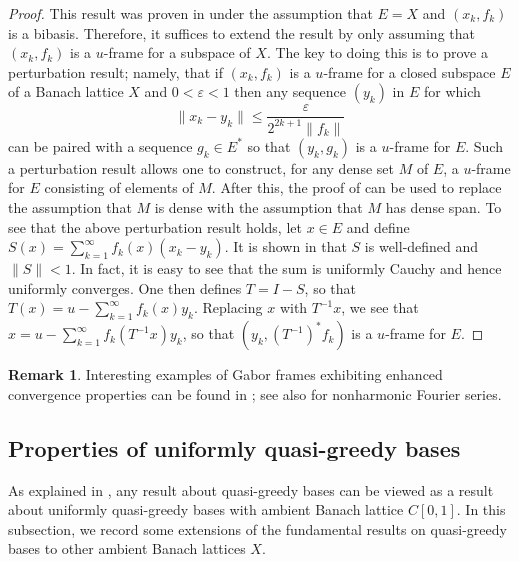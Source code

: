 \documentclass[12pt,leqno]{amsart}
\numberwithin{equation}{section}
\theoremstyle{definition}
\newtheorem{remark}[theorem]{Remark}
\begin{document}
\begin{proof}
    This result was proven in \cite[Theorem 4.4]{FPT2} under the assumption that $E=X$ and $(x_k,f_k)$ is a bibasis. Therefore, it suffices to extend the result by only assuming that $(x_k,f_k)$ is a $u$-frame for a subspace of $X$. The key to doing this is to prove a perturbation result; namely, that if $(x_k,f_k)$ is a $u$-frame for a closed subspace $E$ of a Banach lattice $X$ and $0<\varepsilon<1$ then any sequence $(y_k)$ in $E$ for which
$$\|x_k-y_k\| \leq \frac{\varepsilon}{2^{2k+1}\|f_k\|}$$
can be paired with a sequence $g_k\in E^*$ so that $(y_k,g_k)$ is a $u$-frame for $E$. Such a perturbation result allows one to construct, for any  dense set $M$ of $E$, a $u$-frame for $E$ consisting  of elements of $M$. After this, the proof of \cite[Theorem 4.4]{FPT2} can be used to replace the assumption that $M$ is dense with the assumption that $M$ has dense span. To see that the above perturbation result holds, let $x\in E$ and define $S(x)=\sum_{k=1}^{\infty}f_k(x)(x_k-y_k)$. It is shown in \cite[Lemma 2.3]{PS} that $S$ is well-defined and $\|S\|<1$. In fact, it is easy to see that the sum is uniformly Cauchy and hence uniformly converges. One then defines $T=I-S$, so that $T(x)=u-\sum_{k=1}^\infty f_k(x)y_k$. Replacing $x$ with $T^{-1}x$, we see that $x=u-\sum_{k=1}^\infty f_k(T^{-1}x) y_k$, so that $(y_k, (T^{-1})^*f_k)$ is a $u$-frame for $E$.
\end{proof}
\begin{remark}
  Interesting examples of Gabor frames exhibiting enhanced convergence properties can be found in \cite{MR1817671}; see also \cite{MR1836633} for nonharmonic Fourier series.
\end{remark}



\subsection{Properties of uniformly quasi-greedy bases}\label{Sub3}
 As explained in , any result about quasi-greedy bases can be viewed as a result about uniformly quasi-greedy bases with ambient Banach lattice   $C[0,1]$.  In this subsection, we record some extensions of the fundamental results on quasi-greedy bases   to other ambient Banach lattices $X$. 
 \medskip
 
\end{document}
